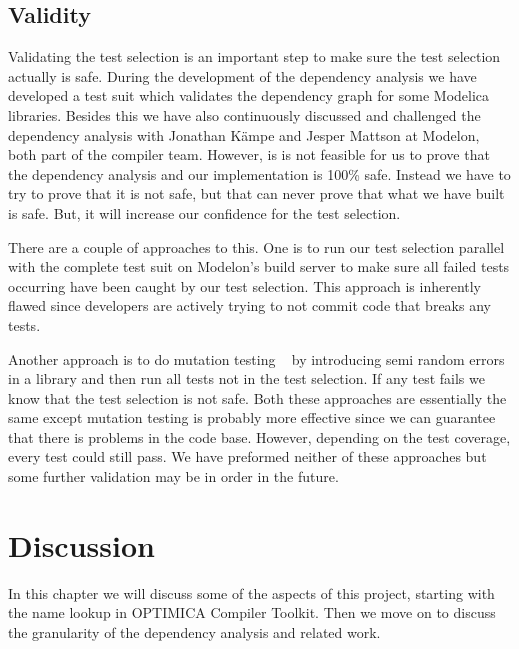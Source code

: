 \documentclass{cslthse-msc}
\begin{document}
\section{Validity}
Validating the test selection is an important step to make sure the test selection actually is safe. During the development of the dependency analysis we have developed a test suit which validates the dependency graph for some Modelica libraries. Besides this we have also continuously discussed and challenged the dependency analysis with Jonathan Kämpe and Jesper Mattson at Modelon, both part of the compiler team. However, is is not feasible for us to prove that the dependency analysis and our implementation is 100\% safe. Instead we have to try to prove that it is not safe, but that can never prove that what we have built is safe. But, it will increase our confidence for the test selection. 

There are a couple of approaches to this. One is to run our test selection parallel with the complete test suit on Modelon's build server to make sure all failed tests occurring have been caught by our test selection. This approach is inherently flawed since developers are actively trying to not commit code that breaks any tests.

Another approach is to do mutation testing ~\cite{DBLP:journals/tse/JiaH11} by introducing semi random errors in a library and then run all tests not in the test selection. If any test fails we know that the test selection is not safe. Both these approaches are essentially the same except mutation testing is probably more effective since we can guarantee that there is problems in the code base. However, depending on the test coverage, every test could still pass. We have preformed neither of these approaches but some further validation may be in order in the future.
\chapter[Discussion]{Discussion}

In this chapter we will discuss some of the aspects of this project, starting with the name lookup in OPTIMICA Compiler Toolkit. Then we move on to discuss the granularity of the dependency analysis and related work. 
\end{document}
